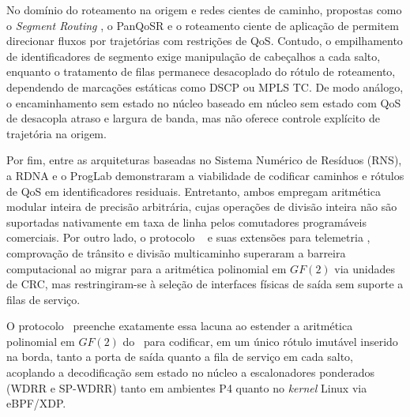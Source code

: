 No domínio do roteamento na origem e redes cientes de caminho, propostas como o \textit{Segment Routing} \cite{rfc8402}, o PanQoSR \cite{wei2026panqosr} e o roteamento ciente de aplicação de \textcite{puttaswamy2025pathaware} permitem direcionar fluxos por trajetórias com restrições de QoS. Contudo, o empilhamento de identificadores de segmento exige manipulação de cabeçalhos a cada salto, enquanto o tratamento de filas permanece desacoplado do rótulo de roteamento, dependendo de marcações estáticas como DSCP ou MPLS TC. De modo análogo, o encaminhamento sem estado no núcleo baseado em núcleo sem estado com QoS de \textcite{Laki2021} desacopla atraso e largura de banda, mas não oferece controle explícito de trajetória na origem.

Por fim, entre as arquiteturas baseadas no Sistema Numérico de Resíduos (RNS), a RDNA \cite{liberato2018rdna} e o ProgLab \cite{froes2020proglab} demonstraram a viabilidade de codificar caminhos e rótulos de QoS em identificadores residuais. Entretanto, ambos empregam aritmética modular inteira de precisão arbitrária, cujas operações de divisão inteira não são suportadas nativamente em taxa de linha pelos comutadores programáveis comerciais. Por outro lado, o protocolo \polka\ \cite{dominicini2020} e suas extensões para telemetria \cite{pereira2024mpolkaint}, comprovação de trânsito \cite{borges2024pot} e divisão multicaminho \cite{santos2024mtspolka} superaram a barreira computacional ao migrar para a aritmética polinomial em $GF(2)$ via unidades de CRC, mas restringiram-se à seleção de interfaces físicas de saída sem suporte a filas de serviço.

O protocolo \nome\ preenche exatamente essa lacuna ao estender a aritmética polinomial em $GF(2)$ do \polka\ para codificar, em um único rótulo imutável inserido na borda, tanto a porta de saída quanto a fila de serviço em cada salto, acoplando a decodificação sem estado no núcleo a escalonadores ponderados (WDRR e SP-WDRR) tanto em ambientes P4 quanto no \textit{kernel} Linux via eBPF/XDP.